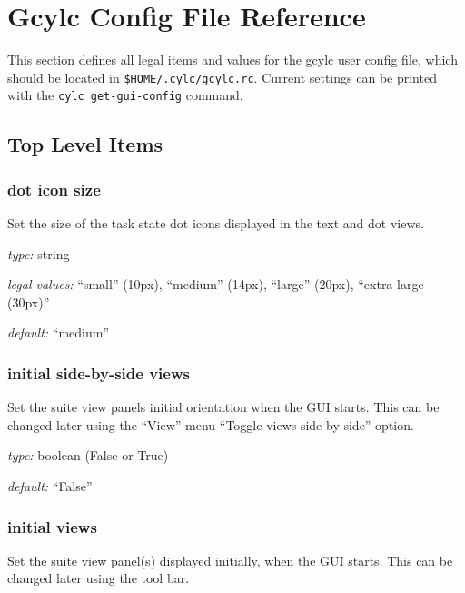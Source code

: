 
\section{Gcylc Config File Reference}
\label{GcylcRCReference}

\lstset{language=bash}

This section defines all legal items and values for the gcylc user
config file, which should be located in
\lstinline=$HOME/.cylc/gcylc.rc=.
Current settings can be printed with the \lstinline=cylc get-gui-config=
command.

\subsection{Top Level Items}

\subsubsection{dot icon size}

Set the size of the task state dot icons displayed in the text and dot
views.

\begin{myitemize}
\item {\em type:} string
\item {\em legal values:} ``small'' (10px), ``medium'' (14px), ``large'' (20px),
        ``extra large (30px)''
\item {\em default:} ``medium''
\end{myitemize}


\subsubsection{initial side-by-side views}

Set the suite view panels initial orientation when the GUI starts.
This can be changed later using the ``View'' menu ``Toggle views side-by-side''
 option.

\begin{myitemize}
\item {\em type:} boolean (False or True)
\item {\em default:} ``False''
\end{myitemize}


\subsubsection{initial views}

Set the suite view panel(s) displayed initially, when the GUI starts.
This can be changed later using the tool bar.

